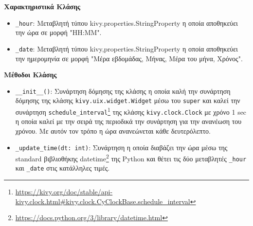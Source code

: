 \noindent\textbf{Χαρακτηριστικά Κλάσης}
\begin{itemize}
	\item \texttt{\_hour}: Μεταβλητή τύπου kivy.properties.StringProperty η οποία αποθηκεύει την ώρα σε μορφή "HH:MM".
	\item \texttt{\_date}: Μεταβλητή τύπου kivy,properties.StringProperty η οποία αποθηκεύει την ημερομηνία σε μορφή "Μέρα εβδομάδας, Μήνας, Μέρα του μήνα, Χρόνος".
\end{itemize}
\newpage
\noindent\textbf{Μέθοδοι Κλάσης}
\begin{itemize}
	\item \texttt{\_\_init\_\_()}: Συνάρτηση δόμησης της κλάσης η οποία καλή την συνάρτηση δόμησης της κλάσης \texttt{kivy.uix.widget.Widget} μέσω του \texttt{super} και καλεί την συνάρτηση \texttt{schedule\_interval}\footnote{\href{https://kivy.org/doc/stable/api-kivy.clock.html\#kivy.clock.CyClockBase.schedule\_interval}{https://kivy.org/doc/stable/api-kivy.clock.html\#kivy.clock.CyClockBase.schedule\_interval}} της κλάσης \texttt{kivy.clock.Clock} με χρόνο 1 sec η οποία καλεί με την σειρά της περιοδικά την συνάρτηση για την ανανέωση του χρόνου. Με αυτόν τον τρόπο η ώρα ανανεώνεται κάθε δευτερόλεπτο.
	\item \texttt{\_update\_time(dt: int)}: Συνάρτηση η οποία διαβάζει την ώρα μέσω της standard βιβλιοθήκης datetime\footnote{\href{https://docs.python.org/3/library/datetime.html}{https://docs.python.org/3/library/datetime.html}} της Python και θέτει τις δύο μεταβλητές \texttt{\_hour} και \texttt{\_date} στις κατάλληλες τιμές.
\end{itemize}